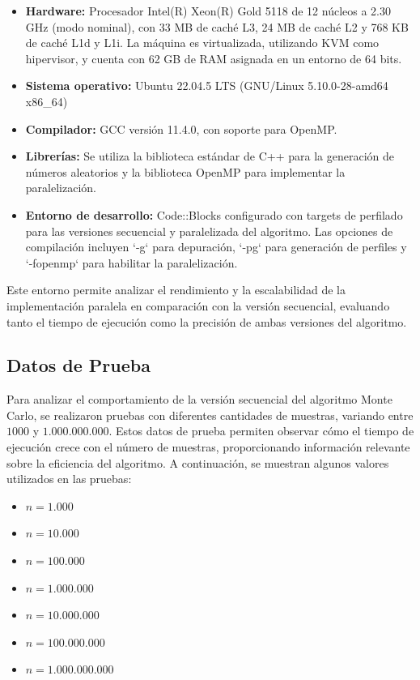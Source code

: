 \documentclass[a4paper, 10pt, onecolumn]{IEEEtran}
\begin{document}
\begin{itemize}
  \item \textbf{Hardware:} Procesador Intel(R) Xeon(R) Gold 5118 de 12 núcleos a 2.30 GHz (modo nominal), con 33 MB de caché L3, 24 MB de caché L2 y 768 KB de caché L1d y L1i. La máquina es virtualizada, utilizando KVM como hipervisor, y cuenta con 62 GB de RAM asignada en un entorno de 64 bits.
  
  \item \textbf{Sistema operativo:} Ubuntu 22.04.5 LTS (GNU/Linux 5.10.0-28-amd64 x86\_64)
  
  \item \textbf{Compilador:} GCC versión 11.4.0, con soporte para OpenMP.
  
  \item \textbf{Librerías:} Se utiliza la biblioteca estándar de C++ para la generación de números aleatorios y la biblioteca OpenMP para implementar la paralelización.
  
  \item \textbf{Entorno de desarrollo:} Code::Blocks configurado con targets de perfilado para las versiones secuencial y paralelizada del algoritmo. Las opciones de compilación incluyen `-g` para depuración, `-pg` para generación de perfiles y `-fopenmp` para habilitar la paralelización.
\end{itemize}

Este entorno permite analizar el rendimiento y la escalabilidad de la implementación paralela en comparación con la versión secuencial, evaluando tanto el tiempo de ejecución como la precisión de ambas versiones del algoritmo.

\subsection{Datos de Prueba}
Para analizar el comportamiento de la versión secuencial del algoritmo Monte Carlo, se realizaron pruebas con diferentes cantidades de muestras, variando entre $1000$ y $1.000.000.000$. Estos datos de prueba permiten observar cómo el tiempo de ejecución crece con el número de muestras, proporcionando información relevante sobre la eficiencia del algoritmo. A continuación, se muestran algunos valores utilizados en las pruebas:

\begin{itemize}
  \item $n = 1.000$
  \item $n = 10.000$
  \item $n = 100.000$
  \item $n = 1.000.000$
  \item $n = 10.000.000$
  \item $n = 100.000.000$
  \item $n = 1.000.000.000$
\end{itemize}
\end{document}
